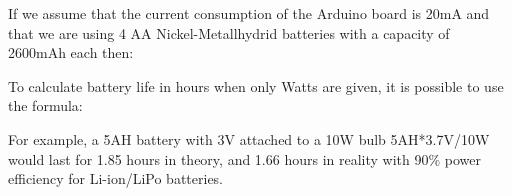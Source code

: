 \medskip


\medskip

If we assume that the current consumption of the Arduino board is 20mA and that we are using 4 AA Nickel-Metallhydrid batteries with a capacity of 2600mAh each then: 


To calculate battery life in hours when only Watts are given, it is possible to use the formula: 

\medskip


\medskip

For example, a 5AH battery with 3V attached to a 10W bulb  5AH*3.7V/10W  would last for 1.85 hours in theory, and 1.66 hours in reality with 90\% power efficiency for Li-ion/LiPo batteries. 






